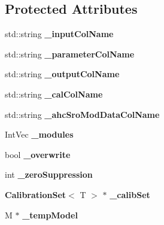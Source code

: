 \subsection*{Protected Attributes}
\begin{DoxyCompactItemize}
\item 
std::string {\bfseries \_\-inputColName}\label{classCALICE_1_1FastCalib2DProcessor_ad2a51e143d704ff9d9d33d155381fa2b}

\item 
std::string {\bfseries \_\-parameterColName}\label{classCALICE_1_1FastCalib2DProcessor_aeeddf47e62b3ffa578893b3e040a46c9}

\item 
std::string {\bfseries \_\-outputColName}\label{classCALICE_1_1FastCalib2DProcessor_a67e450d381f338c512bfb61950adc5d8}

\item 
std::string {\bfseries \_\-calColName}\label{classCALICE_1_1FastCalib2DProcessor_acea129179d4f2e8c00901817a63448ab}

\item 
std::string {\bfseries \_\-ahcSroModDataColName}\label{classCALICE_1_1FastCalib2DProcessor_aa1d4ac2e926484e24dd1dbdaf72ea2d5}

\item 
IntVec {\bfseries \_\-modules}\label{classCALICE_1_1FastCalib2DProcessor_a510d4c71eeac41329b513092d81f37e4}

\item 
bool {\bfseries \_\-overwrite}\label{classCALICE_1_1FastCalib2DProcessor_ad4f708e7935bc324ce4df8a2ab97cae2}

\item 
int {\bfseries \_\-zeroSuppression}\label{classCALICE_1_1FastCalib2DProcessor_a3ced223e8bc88a1530a2edd1a2336b5e}

\item 
{\bf CalibrationSet}$<$ T $>$ $\ast$ {\bfseries \_\-calibSet}\label{classCALICE_1_1FastCalib2DProcessor_a8bc3270235a8c869a5b8d72d74709bce}

\item 
M $\ast$ {\bfseries \_\-tempModel}\label{classCALICE_1_1FastCalib2DProcessor_a12febd0f31953e9426311be25b2a4aaa}

\end{DoxyCompactItemize}
